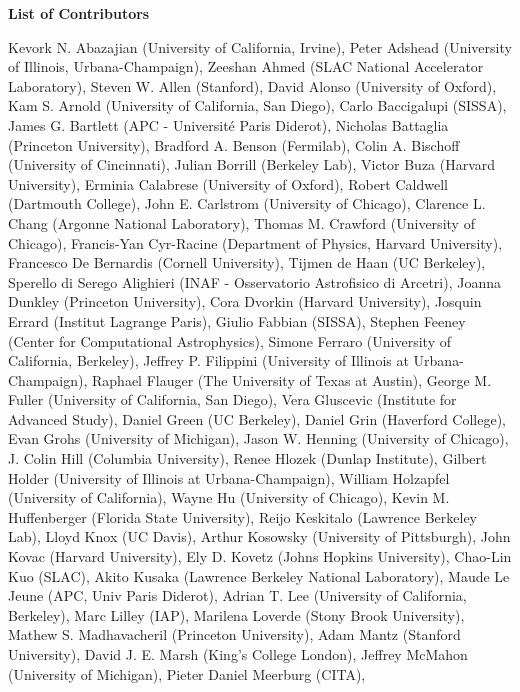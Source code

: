 \begin{center}
\textbf{List of Contributors}
\end{center}
Kevork N. Abazajian (University of California, Irvine),
Peter Adshead (University of Illinois, Urbana-Champaign),
Zeeshan Ahmed (SLAC National Accelerator Laboratory),
Steven W. Allen (Stanford),
David Alonso (University of Oxford),
Kam S. Arnold (University of California, San Diego),
Carlo Baccigalupi (SISSA),
James G. Bartlett (APC - Université Paris Diderot),
Nicholas Battaglia (Princeton University),
Bradford A. Benson (Fermilab),
Colin A. Bischoff (University of Cincinnati),
Julian Borrill (Berkeley Lab),
Victor Buza (Harvard University),
Erminia Calabrese (University of Oxford),
Robert Caldwell (Dartmouth College),
John E. Carlstrom (University of Chicago),
Clarence L. Chang (Argonne National Laboratory),
Thomas M. Crawford (University of Chicago),
Francis-Yan Cyr-Racine (Department of Physics, Harvard University),
Francesco De Bernardis (Cornell University),
Tijmen de Haan (UC Berkeley),
Sperello di Serego Alighieri (INAF - Osservatorio Astrofisico di Arcetri),
Joanna Dunkley (Princeton University),
Cora Dvorkin (Harvard University),
Josquin Errard (Institut Lagrange Paris),
Giulio Fabbian (SISSA),
Stephen Feeney (Center for Computational Astrophysics),
Simone Ferraro (University of California, Berkeley),
Jeffrey P. Filippini (University of Illinois at Urbana-Champaign),
Raphael Flauger (The University of Texas at Austin),
George M. Fuller (University of California, San Diego),
Vera Gluscevic (Institute for Advanced Study),
Daniel Green (UC Berkeley),
Daniel Grin (Haverford College),
Evan Grohs (University of Michigan),
Jason W. Henning (University of Chicago),
J. Colin Hill (Columbia University),
Renee Hlozek (Dunlap Institute),
Gilbert Holder (University of Illinois at Urbana-Champaign),
William Holzapfel (University of California),
Wayne Hu (University of Chicago),
Kevin M. Huffenberger (Florida State University),
Reijo Keskitalo (Lawrence Berkeley Lab),
Lloyd Knox (UC Davis),
Arthur Kosowsky (University of Pittsburgh),
John Kovac (Harvard University),
Ely D. Kovetz (Johns Hopkins University),
Chao-Lin Kuo (SLAC),
Akito Kusaka (Lawrence Berkeley National Laboratory),
Maude Le Jeune (APC, Univ Paris Diderot),
Adrian T. Lee (University of California, Berkeley),
Marc Lilley (IAP),
Marilena Loverde (Stony Brook University),
Mathew S. Madhavacheril (Princeton University),
Adam Mantz (Stanford University),
David J. E. Marsh (King's College London),
Jeffrey McMahon (University of Michigan),
Pieter Daniel Meerburg (CITA),
